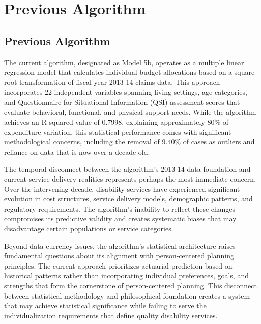 \chapter{Previous Algorithm}  \newpage

\section{Previous Algorithm}

The current algorithm, designated as Model 5b, operates as a multiple linear regression model that calculates individual budget allocations based on a square-root transformation of fiscal year 2013-14 claims data. This approach incorporates 22 independent variables spanning living settings, age categories, and Questionnaire for Situational Information (QSI) assessment scores that evaluate behavioral, functional, and physical support needs. While the algorithm achieves an R-squared value of 0.7998, explaining approximately 80\% of expenditure variation, this statistical performance comes with significant methodological concerns, including the removal of 9.40\% of cases as outliers and reliance on data that is now over a decade old.

The temporal disconnect between the algorithm's 2013-14 data foundation and current service delivery realities represents perhaps the most immediate concern. Over the intervening decade, disability services have experienced significant evolution in cost structures, service delivery models, demographic patterns, and regulatory requirements. The algorithm's inability to reflect these changes compromises its predictive validity and creates systematic biases that may disadvantage certain populations or service categories.

Beyond data currency issues, the algorithm's statistical architecture raises fundamental questions about its alignment with person-centered planning principles. The current approach prioritizes actuarial prediction based on historical patterns rather than incorporating individual preferences, goals, and strengths that form the cornerstone of person-centered planning. This disconnect between statistical methodology and philosophical foundation creates a system that may achieve statistical significance while failing to serve the individualization requirements that define quality disability services.

